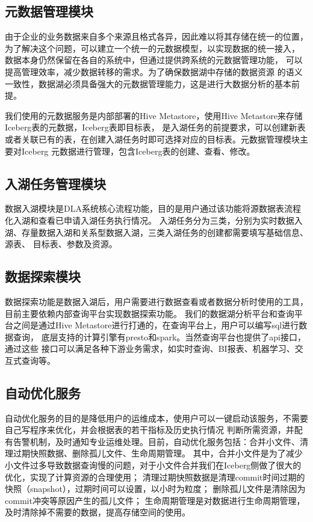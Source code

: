 \subsection{元数据管理模块}

由于企业的业务数据来自多个来源且格式各异，因此难以将其存储在统一的位置，
为了解决这个问题，可以建立一个统一的元数据模型，以实现数据的统一接入\cite{18,19}，
数据本身仍然保留在各自的系统中，但通过提供跨系统的元数据管理功能，
可以提高管理效率，减少数据转移的需求。为了确保数据湖中存储的数据资源
的语义一致性，数据湖必须具备强大的元数据管理能力，这是进行大数据分析的基本前提\cite{20}。

我们使用的元数据服务是内部部署的Hive Metastore，使用Hive Metastore来存储Iceberg表的元数据，Iceberg表即目标表，
是入湖任务的前提要求，可以创建新表或者关联已有的表，在创建入湖任务时即可选择对应的目标表。元数据管理模块主要对Iceberg
元数据进行管理，包含Iceberg表的创建、查看、修改。

\subsection{入湖任务管理模块}

数据入湖模块是DLA系统核心流程功能，目的是用户通过该功能将源数据表流程化入湖和查看已申请入湖任务执行情况。
入湖任务分为三类，分别为实时数据入湖、存量数据入湖和关系型数据入湖，三类入湖任务的创建都需要填写基础信息、源表、
目标表、参数及资源。

\subsection{数据探索模块}

数据探索功能是数据入湖后，用户需要进行数据查看或者数据分析时使用的工具，目前主要依赖内部查询平台实现数据探索功能。
我们的数据湖分析平台和查询平台之间是通过Hive Metastore\cite{30}进行打通的，在查询平台上，用户可以编写sql进行数据查询，
底层支持的计算引擎有presto\cite{16}和spark\cite{23}。当然查询平台也提供了api接口，通过这些
接口可以满足各种下游业务需求，如实时查询、BI报表、机器学习、交互式查询等。

\subsection{自动优化服务}

自动优化服务的目的是降低用户的运维成本，使用户可以一键启动该服务，不需要自己写程序来优化，并会根据表的若干指标及历史执行情况
判断所需资源，并配有告警机制，及时通知专业运维处理。目前，自动优化服务包括：合并小文件、清理过期快照数据、删除孤儿文件、生命周期管理。
其中，合并小文件是为了减少小文件过多导致数据查询慢的问题，对于小文件合并我们在Iceberg侧做了很大的优化，实现了计算资源的合理使用；
清理过期快照数据是清理commit时间过期的快照（snapshot），过期时间可以设置，以小时为粒度；
删除孤儿文件是清除因为commit冲突等原因产生的孤儿文件；
生命周期管理是对数据进行生命周期管理，及时清除掉不需要的数据，提高存储空间的使用。

